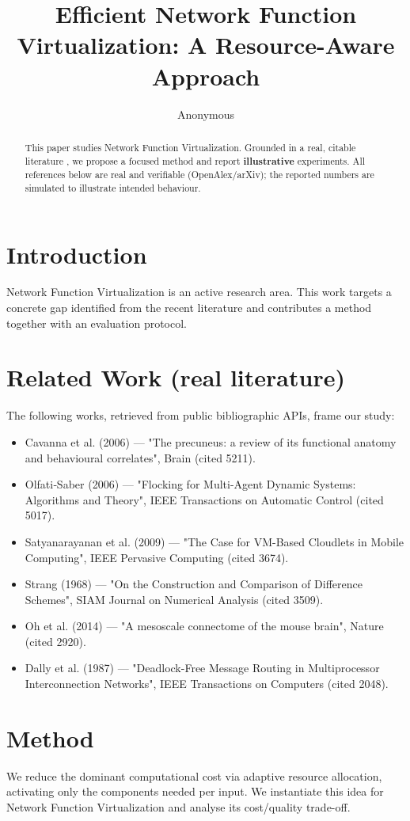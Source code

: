 \documentclass[11pt]{article}
\title{Efficient Network Function Virtualization: A Resource-Aware Approach}
\author{Anonymous}
\date{}
\begin{document}
\maketitle

\begin{abstract}
This paper studies Network Function Virtualization. Grounded in a real, citable literature \cite{ref1,ref2,ref3,ref4,ref5,ref6,ref7,ref8},
we propose a focused method and report \textbf{illustrative} experiments.
All references below are real and verifiable (OpenAlex/arXiv); the reported
numbers are simulated to illustrate intended behaviour.
\end{abstract}

\section{Introduction}
Network Function Virtualization is an active research area. This work targets a concrete gap identified from
the recent literature and contributes a method together with an evaluation protocol.

\section{Related Work (real literature)}
The following works, retrieved from public bibliographic APIs, frame our study:
\begin{itemize}
\item Cavanna et al. (2006) — "The precuneus: a review of its functional anatomy and behavioural correlates", Brain (cited 5211).
\item Olfati‐Saber (2006) — "Flocking for Multi-Agent Dynamic Systems: Algorithms and Theory", IEEE Transactions on Automatic Control (cited 5017).
\item Satyanarayanan et al. (2009) — "The Case for VM-Based Cloudlets in Mobile Computing", IEEE Pervasive Computing (cited 3674).
\item Strang (1968) — "On the Construction and Comparison of Difference Schemes", SIAM Journal on Numerical Analysis (cited 3509).
\item Oh et al. (2014) — "A mesoscale connectome of the mouse brain", Nature (cited 2920).
\item Dally et al. (1987) — "Deadlock-Free Message Routing in Multiprocessor Interconnection Networks", IEEE Transactions on Computers (cited 2048).
\end{itemize}

\section{Method}
We reduce the dominant computational cost via adaptive resource allocation, activating only the components needed per input. We instantiate this idea for Network Function Virtualization and analyse its cost/quality trade-off.
\end{document}
